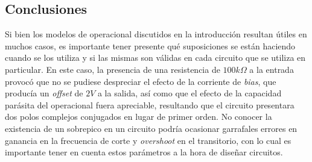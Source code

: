\documentclass[../../main.tex]{subfiles}
\begin{document}
\subsection{Conclusiones}

Si bien los modelos de operacional discutidos en la introducci\'on resultan \'utiles en muchos casos, es importante tener presente qu\'e suposiciones se est\'an haciendo cuando se los utiliza y si las mismas son v\'alidas en cada circuito que se utiliza en particular. En este caso, la presencia de una resistencia de $100k\Omega$ a la entrada provoc\'o que no se pudiese despreciar el efecto de la corriente de \textit{bias}, que produc\'ia un \textit{offset} de $2V$ a la salida, as\'i como que el efecto de la capacidad par\'asita del operacional fuera apreciable, resultando que el circuito presentara dos polos complejos conjugados en lugar de primer orden. No conocer la existencia de un sobrepico en un circuito podr\'ia ocasionar garrafales errores en ganancia en la frecuencia de corte y \textit{overshoot} en el transitorio, con lo cual es importante tener en cuenta estos par\'ametros a la hora de dise\~nar circuitos.\par
\end{document}
